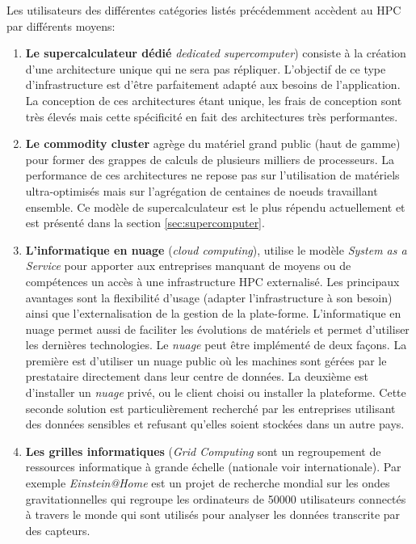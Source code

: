         Les utilisateurs des différentes catégories listés précédemment accèdent au HPC par différents moyens:
        \begin{enumerate}
            
            \item \textbf{Le supercalculateur dédié} \textit{dedicated supercomputer}) consiste à la création d'une architecture unique qui ne sera pas répliquer. L'objectif de ce type d'infrastructure est d'être parfaitement adapté aux besoins de l'application. La conception de ces architectures étant unique, les frais de conception sont très élevés mais cette spécificité en fait des architectures très performantes. 
            
            \item \textbf{Le commodity cluster} agrège du matériel grand public (haut de gamme) pour former des grappes de calculs de plusieurs milliers de processeurs. La performance de ces architectures ne repose pas sur l'utilisation de matériels ultra-optimisés mais sur l'agrégation de centaines de noeuds travaillant ensemble. Ce modèle de supercalculateur est le plus répendu actuellement et est présenté dans la section \autoref{sec:supercomputer}.  
            
            \item \textbf{L'informatique en nuage} (\textit{cloud computing}),  utilise le modèle \textit{System as a Service} pour apporter aux entreprises manquant de moyens ou de compétences un accès à une infrastructure HPC externalisé. Les principaux avantages sont la flexibilité d'usage (adapter l'infrastructure à son besoin) ainsi que l'externalisation de la gestion de la plate-forme. L'informatique en nuage permet aussi de faciliter les évolutions de matériels et permet d'utiliser les dernières technologies. Le \textit{nuage} peut être implémenté de deux façons. La première est d'utiliser un nuage public où les machines sont gérées par le prestataire directement dans leur centre de données. La deuxième est d'installer un \textit{nuage} privé, ou le client choisi ou installer la plateforme. Cette seconde solution est particulièrement recherché par les entreprises utilisant des données sensibles et refusant qu'elles soient stockées dans un autre pays. 
            
            
        \item \textbf{Les grilles informatiques} (\textit{Grid Computing} sont un regroupement de ressources informatique à grande échelle (nationale voir internationale). Par exemple \textit{Einstein@Home} \cite{PhysRevD.80.042003} est un projet de recherche mondial sur les ondes gravitationnelles  qui regroupe les ordinateurs de 50000 utilisateurs connectés à travers le monde qui sont utilisés pour  analyser les données transcrite par des capteurs.
        \end{enumerate}
    
